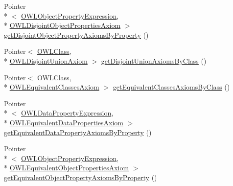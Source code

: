 \begin{DoxyCompactItemize}
\item 
Pointer\\*
$<$ \hyperlink{interfaceorg_1_1semanticweb_1_1owlapi_1_1model_1_1_o_w_l_object_property_expression}{O\-W\-L\-Object\-Property\-Expression}, \\*
\hyperlink{interfaceorg_1_1semanticweb_1_1owlapi_1_1model_1_1_o_w_l_disjoint_object_properties_axiom}{O\-W\-L\-Disjoint\-Object\-Properties\-Axiom} $>$ \hyperlink{interfaceuk_1_1ac_1_1manchester_1_1cs_1_1owl_1_1owlapi_1_1_internals_a9d3be28f5046ca885c9105a880d12117}{get\-Disjoint\-Object\-Property\-Axioms\-By\-Property} ()
\item 
Pointer$<$ \hyperlink{interfaceorg_1_1semanticweb_1_1owlapi_1_1model_1_1_o_w_l_class}{O\-W\-L\-Class}, \\*
\hyperlink{interfaceorg_1_1semanticweb_1_1owlapi_1_1model_1_1_o_w_l_disjoint_union_axiom}{O\-W\-L\-Disjoint\-Union\-Axiom} $>$ \hyperlink{interfaceuk_1_1ac_1_1manchester_1_1cs_1_1owl_1_1owlapi_1_1_internals_acf23a322901ee614f675c17fec3a7ad3}{get\-Disjoint\-Union\-Axioms\-By\-Class} ()
\item 
Pointer$<$ \hyperlink{interfaceorg_1_1semanticweb_1_1owlapi_1_1model_1_1_o_w_l_class}{O\-W\-L\-Class}, \\*
\hyperlink{interfaceorg_1_1semanticweb_1_1owlapi_1_1model_1_1_o_w_l_equivalent_classes_axiom}{O\-W\-L\-Equivalent\-Classes\-Axiom} $>$ \hyperlink{interfaceuk_1_1ac_1_1manchester_1_1cs_1_1owl_1_1owlapi_1_1_internals_ae1a76137a41c25a37955fcc73087ac3e}{get\-Equivalent\-Classes\-Axioms\-By\-Class} ()
\item 
Pointer\\*
$<$ \hyperlink{interfaceorg_1_1semanticweb_1_1owlapi_1_1model_1_1_o_w_l_data_property_expression}{O\-W\-L\-Data\-Property\-Expression}, \\*
\hyperlink{interfaceorg_1_1semanticweb_1_1owlapi_1_1model_1_1_o_w_l_equivalent_data_properties_axiom}{O\-W\-L\-Equivalent\-Data\-Properties\-Axiom} $>$ \hyperlink{interfaceuk_1_1ac_1_1manchester_1_1cs_1_1owl_1_1owlapi_1_1_internals_a8b14b970720f03319414a4eec1230dfc}{get\-Equivalent\-Data\-Property\-Axioms\-By\-Property} ()
\item 
Pointer\\*
$<$ \hyperlink{interfaceorg_1_1semanticweb_1_1owlapi_1_1model_1_1_o_w_l_object_property_expression}{O\-W\-L\-Object\-Property\-Expression}, \\*
\hyperlink{interfaceorg_1_1semanticweb_1_1owlapi_1_1model_1_1_o_w_l_equivalent_object_properties_axiom}{O\-W\-L\-Equivalent\-Object\-Properties\-Axiom} $>$ \hyperlink{interfaceuk_1_1ac_1_1manchester_1_1cs_1_1owl_1_1owlapi_1_1_internals_a49f87cdbdafe6d7c6a3a1e355ce8435b}{get\-Equivalent\-Object\-Property\-Axioms\-By\-Property} ()

\end{DoxyCompactItemize}
